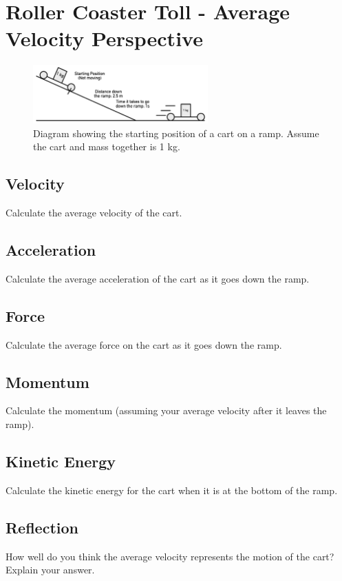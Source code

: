 \documentclass[12pt, fleqn, paper=letter, oneside]{scrartcl}
\begin{document}
\clearpage
\section{Roller Coaster Toll - Average Velocity Perspective}
\begin{figure}[h]
\centering
\includegraphics[width=0.6\textwidth]{averagevelocity}
\caption{Diagram showing the starting position of a cart on a ramp.  Assume the cart and mass together is 1 kg.}
\end{figure}

\subsection{Velocity}
Calculate the average velocity of the cart.

\vfill
\subsection{Acceleration}
Calculate the average acceleration of the cart as it goes down the ramp.

\vfill
\subsection{Force}
Calculate the average force on the cart as it goes down the ramp.

\vfill
\subsection{Momentum}
Calculate the momentum (assuming your average velocity after it leaves the ramp).

\vfill
\subsection{Kinetic Energy}
Calculate the kinetic energy for the cart when it is at the bottom of the ramp.

\vfill
\subsection{Reflection}
How well do you think the average velocity represents the motion of the cart?  Explain your answer.

\vfill
\end{document}
